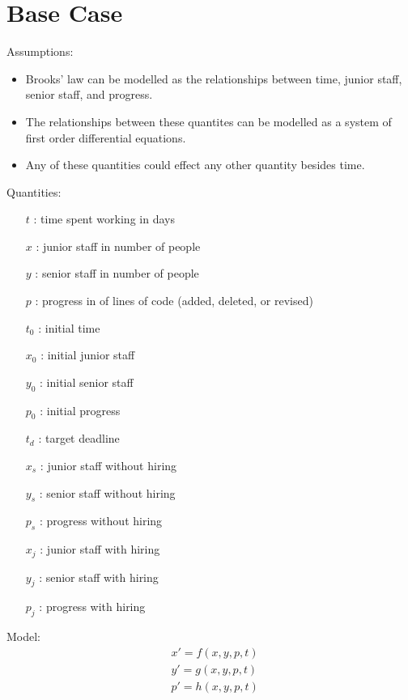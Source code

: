 \documentclass{article}
\newenvironment{atomize}
    {\begin{list} {} {
            \setlength\itemindent{0pt}
            \setlength\leftmargin{10pt}
            \setlength\labelwidth{0pt}
    }}
    {\end{list}}
\begin{document}
\section*{Base Case}
  \begin{atomize}
    \item Assumptions:
      \begin{itemize}
				\item Brooks' law can be modelled as the relationships between
				time, junior staff, senior staff, and progress.
				\item The relationships between these quantites can be modelled
				as a system of first order differential equations.
				\item Any of these quantities could effect any other quantity besides
				time.  
        \end{itemize}

    \item Quantities:
      \begin{itemize}
        \item [$t$]: time spent working in days
        \item [$x$]: junior staff in number of people
        \item [$y$]: senior staff in number of people
        \item [$p$]: progress in of lines of code (added, deleted, or revised)
        \item [$t_{0}$]: initial time
        \item [$x_{0}$]: initial junior staff
        \item [$y_{0}$]: initial senior staff
        \item [$p_{0}$]: initial progress
        \item [$t_{d}$]: target deadline
				\item [$x_{s}$]: junior staff without hiring
				\item [$y_{s}$]: senior staff without hiring
        \item [$p_{s}$]: progress without hiring
        \item [$x_{j}$]: junior staff with hiring
				\item [$y_{j}$]: senior staff with hiring
        \item [$p_{j}$]: progress with hiring
      \end{itemize}
	
    \item Model:
      \begin{align*}
        &x\prime = f\left(x, y, p, t\right) \\[6pt]
        &y\prime = g\left(x, y, p, t\right) \\[6pt]
        &p\prime = h\left(x, y, p, t\right)
      \end{align*}
  \end{atomize}
\end{document}
